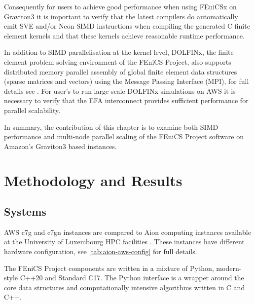 Consequently for users to achieve good performance when using FEniCSx on
Graviton3 it is important to verify that the latest compilers do automatically
emit SVE and/or Neon SIMD instructions when compiling the generated C finite
element kernels and that these kernels achieve reasonable runtime performance. 

In addition to SIMD parallelisation at the kernel level, DOLFINx, the finite
element problem solving environment of the FEniCS Project, also supports
distributed memory parallel assembly of global finite element data structures
(sparse matrices and vectors) using the Message Passing Interface (MPI), for
full details see \cite{baratta_dolfinx_2023}. For user's to run large-scale
DOLFINx simulations on AWS it is necessary to verify that the EFA interconnect
provides sufficient performance for parallel scalability.

In summary, the contribution of this chapter is to examine both SIMD
performance and multi-node parallel scaling of the FEniCS Project software on
Amazon's Graviton3 based instances. 

\section*{Methodology and Results}

\subsection*{Systems}
AWS c7g and c7gn instances are compared to Aion computing instances available
at the University of Luxembourg HPC facilities \citep{VCPKVO_HPCCT22}. These
instances have different hardware configuration, see
\autoref{tab:aion-aws-config} for full details.

The FEniCS Project components are written in a mixture of Python, modern-style
C++20 and Standard C17. The Python interface is a wrapper around the core data
structures and computationally intensive algorithms written in C and C++.

